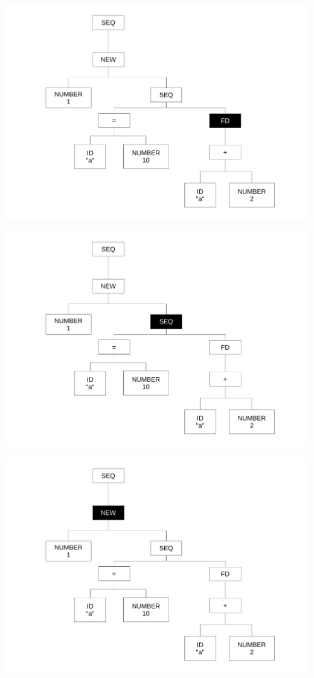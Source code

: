 \begin{frame}
\includegraphics[scale=0.3]{doc/Presentation/img/arbre8.pdf}
\end{frame}

\begin{frame}
\includegraphics[scale=0.3]{doc/Presentation/img/arbre4.pdf}
\end{frame}

\begin{frame}
\includegraphics[scale=0.3]{doc/Presentation/img/arbre2.pdf}
\end{frame}

